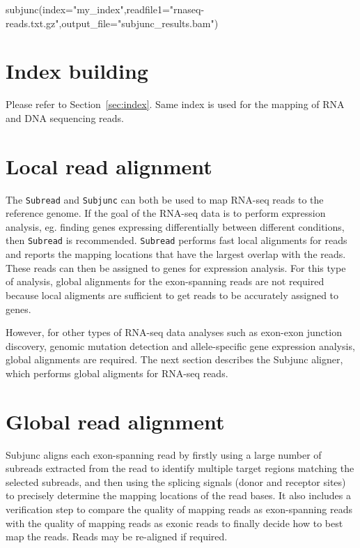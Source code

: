 \documentclass[12pt]{report}
\newcommand{\code}[1]{{\small\texttt{#1}}}
\newcommand{\Subjunc}{\textsf{Subjunc}}
\begin{document}
\begin{Rcode}
subjunc(index="my_index",readfile1="rnaseq-reads.txt.gz",output_file="subjunc_results.bam")
\end{Rcode}


\section{Index building}

Please refer to Section~\ref{sec:index}.
Same index is used for the mapping of RNA and DNA sequencing reads. 

\section{Local read alignment}

The \code{Subread} and \code{Subjunc} can both be used to map RNA-seq reads to the reference genome.
If the goal of the RNA-seq data is to perform expression analysis, eg. finding genes expressing differentially between different conditions, then \code{Subread} is recommended.
\code{Subread} performs fast local alignments for reads and reports the mapping locations that have the largest overlap with the reads.
These reads can then be assigned to genes for expression analysis.
For this type of analysis, global alignments for the exon-spanning reads are not required because local aligments are sufficient to get reads to be accurately assigned to genes.

However, for other types of RNA-seq data analyses such as exon-exon junction discovery, genomic mutation detection and allele-specific gene expression analysis, global alignments are required.
The next section describes the {\Subjunc} aligner, which performs global aligments for RNA-seq reads.
 
\section{Global read alignment}

{\Subjunc} aligns each exon-spanning read by firstly using a large number of subreads extracted from the read to identify multiple target regions matching the selected subreads, and then using the splicing signals (donor and receptor sites) to precisely determine the mapping locations of the read bases.
It also includes a verification step to compare the quality of mapping reads as exon-spanning reads with the quality of mapping reads as exonic reads to finally decide how to best map the reads.
Reads may be re-aligned if required.
\end{document}

